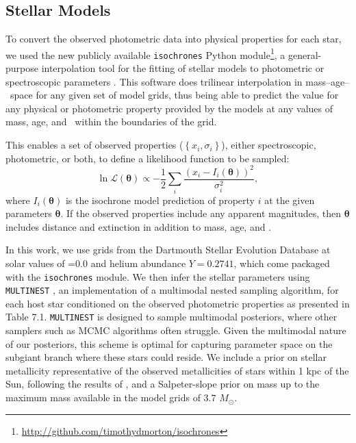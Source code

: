 \subsection{Stellar Models}
\label{sec:stellarparams}
To convert the observed photometric data into physical properties for each
star, we used the new publicly available \texttt{isochrones} Python module\footnote{
\url{http://github.com/timothydmorton/isochrones}}, a general-purpose
interpolation tool for the fitting of stellar models to photometric or spectroscopic
parameters \citep{Morton15a}.
This software does trilinear interpolation in mass--age--\feh\ space for any
given set of model grids, thus being able to predict the value for any
physical or photometric property provided by the models at any values of
mass, age, and \feh\ within the boundaries of the grid.

This enables a set of observed properties ($\left\{ x_i, \sigma_i \right\}$),
either spectroscopic, photometric,
or both, to define a likelihood function to be sampled:
\begin{equation}
\label{eq:ischochronelhood}
\ln \mathcal L(\boldsymbol{\theta}) \propto -\frac{1}{2} \displaystyle \sum_i \frac{\left(x_i -
  I_i\left(\boldsymbol{\theta} \right)\right)^2}{\sigma_i^2},
\end{equation}
where $I_i(\boldsymbol{\theta})$ is the isochrone model prediction of property
$i$ at the given parameters $\boldsymbol{\theta}$.
If the observed properties include any apparent magnitudes, then
$\boldsymbol{\theta}$ includes distance and extinction in addition
to mass, age, and \feh.

In this work, we use grids from the Dartmouth Stellar
Evolution Database \citep{Dotter08} at solar values of \afe=$0.0$ and
helium abundance $Y=0.2741$, which come packaged with the \texttt{isochrones}
module.
We then infer the stellar parameters using \texttt{MULTINEST} \citep{Feroz09},
an implementation of a multimodal nested sampling algorithm,
for each host star conditioned on the observed
photometric properties as presented in Table 7.1.
\texttt{MULTINEST} is designed to sample multimodal posteriors, where other 
samplers such as MCMC algorithms often struggle. 
Given the multimodal nature of our posteriors, this scheme is optimal for 
capturing parameter space on the subgiant branch where these stars could reside.
We include a prior on stellar metallicity representative of the observed metallicities
of stars within 1 kpc of the Sun, following the results of \citet{Hayden15}, and a Salpeter-slope
prior on mass up to the maximum mass available in the model grids of $3.7$ $M_\odot$.

